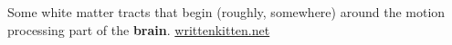 Some white matter tracts that begin (roughly, somewhere) around the motion processing part of the \textbf{brain}. \href{kittens}{writtenkitten.net}
